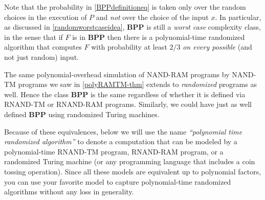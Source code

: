 Note that the probability in \eqref{BPPdefinitioneq} is taken only over
the random choices in the execution of \(P\) and \emph{not} over the
choice of the input \(x\). In particular, as discussed in
\cref{randomworstcaseidea}, \(\mathbf{BPP}\) is still a \emph{worst
case} complexity class, in the sense that if \(F\) is in
\(\mathbf{BPP}\) then there is a polynomial-time randomized algorithm
that computes \(F\) with probability at least \(2/3\) \emph{on every
possible} (and not just random) input.

The same polynomial-overhead simulation of NAND-RAM programs by NAND-TM
programs we saw in \cref{polyRAMTM-thm} extends to \emph{randomized}
programs as well. Hence the class \(\mathbf{BPP}\) is the same
regardless of whether it is defined via RNAND-TM or RNAND-RAM programs.
Similarly, we could have just as well defined \(\mathbf{BPP}\) using
randomized Turing machines.

Because of these equivalences, below we will use the name
\emph{``polynomial time randomized algorithm''} to denote a computation
that can be modeled by a polynomial-time RNAND-TM program, RNAND-RAM
program, or a randomized Turing machine (or any programming language
that includes a coin tossing operation). Since all these models are
equivalent up to polynomial factors, you can use your favorite model to
capture polynomial-time randomized algorithms without any loss in
generality.

\hypertarget{choosingfromsetex}{}

